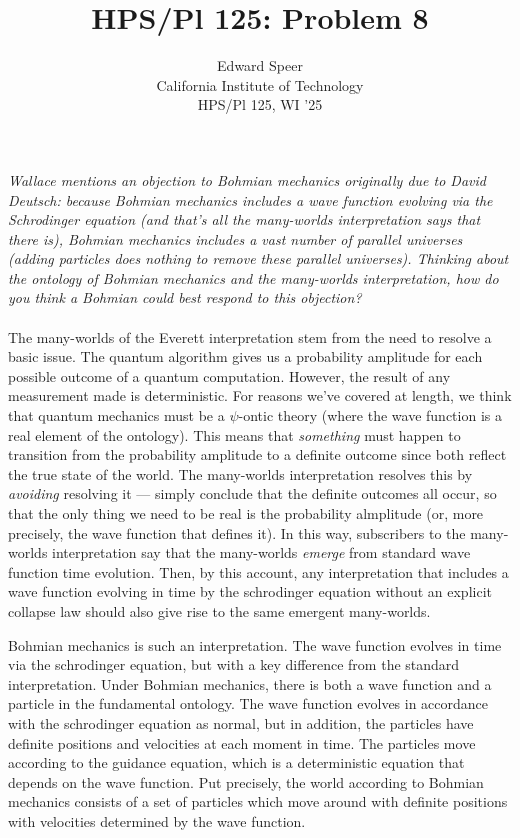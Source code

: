 \documentclass[11pt, a4paper]{article}
\title{HPS/Pl 125: Problem 8}
\author{%
  Edward Speer
  \\
  California Institute of Technology\\
  HPS/Pl 125, WI '25 \\
}
\date{\monthyeardate}
\begin{document}
\maketitle

\noindent \emph{Wallace mentions an objection to Bohmian mechanics originally
due to David Deutsch: because Bohmian mechanics includes a wave function
evolving via the Schrodinger equation (and that's all the many-worlds
interpretation says that there is), Bohmian mechanics includes a vast number of
parallel universes (adding particles does nothing to remove these parallel
universes). Thinking about the ontology of Bohmian mechanics and the many-worlds
interpretation, how do you think a Bohmian could best respond to this
objection?}
\\ \hfill \\
The many-worlds of the Everett interpretation stem from the need to resolve a
basic issue. The quantum algorithm gives us a probability amplitude for each
possible outcome of a quantum computation. However, the result of any
measurement made is deterministic. For reasons we've covered at length, we think
that quantum mechanics must be a $\psi$-ontic theory (where the wave function is
a real element of the ontology). This means that \emph{something} must happen to
transition from the probability amplitude to a definite outcome since both
reflect the true state of the world. The many-worlds interpretation resolves
this by \emph{avoiding} resolving it — simply conclude that the definite
outcomes all occur, so that the only thing we need to be real is the probability
almplitude (or, more precisely, the wave function that defines it). In this way,
subscribers to the many-worlds interpretation say that the many-worlds
\emph{emerge} from standard wave function time evolution. Then, by this account,
any interpretation that includes a wave function evolving in time by the
schrodinger equation without an explicit collapse law should also give rise to
the same emergent many-worlds.

Bohmian mechanics is such an interpretation. The wave function evolves in time
via the schrodinger equation, but with a key difference from the standard 
interpretation. Under Bohmian mechanics, there is both a wave function and a
particle in the fundamental ontology. The wave function evolves in accordance
with the schrodinger equation as normal, but in addition, the particles have
definite positions and velocities at each moment in time. The particles move
according to the guidance equation, which is a deterministic equation that
depends on the wave function. Put precisely, the world according to Bohmian
mechanics consists of a set of particles which move around with definite
positions with velocities determined by the wave function.
\end{document}

